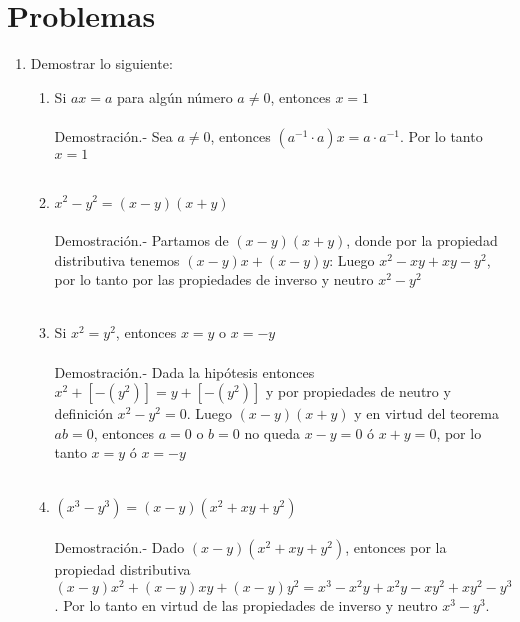 \section{Problemas}
\begin{enumerate}[\bfseries 1.]

\item Demostrar lo siguiente:
\begin{enumerate}[\bfseries i)]
\item Si $ax=a$ para algún número $a\neq 0$, entonces $x=1$\\\\
Demostración.- \; Sea $a\neq 0$, entonces $(a^{-1}\cdot a)x=a\cdot a^{-1}$. Por lo tanto $x = 1$\\\\
 
\item $x^2-y^2=(x-y)(x+y)$\\\\
Demostración.- \; Partamos de $(x-y)(x+y)$, donde por la propiedad distributiva tenemos $(x-y)x+(x-y)y$: Luego $x^2-xy+xy-y^2$, por lo tanto por las propiedades de inverso y  neutro $x^2-y^2$\\\\

\item Si $x^2=y^2$, entonces $x=y$ o $x=-y$\\\\
Demostración.- \; Dada la hipótesis entonces $x^2+\left[ - (y^2) \right]=y+\left[ - (y^2) \right]$ y por propiedades de neutro y definición $x^2-y^2=0$. Luego $(x-y)(x+y)$ y en virtud del teorema $ab=0$, entonces $a=0$ o $b=0$ no queda $x-y=0$ ó $x+y=0$, por lo tanto $x=y$ ó $x=-y$ \\\\ 

\item $(x^3-y^3)=(x-y)(x^2+xy+y^2)$\\\\
Demostración.- \; Dado $(x-y)(x^2+xy+y^2)$, entonces por la propiedad distributiva $(x-y)x^2+(x-y)xy+(x-y)y^2 = x^3 -x^2y +x^2y-xy^2+xy^2-y^3$. Por lo tanto en virtud de las propiedades de inverso y neutro $x^3-y^3$.\\\\


\end{enumerate}
\end{enumerate}
